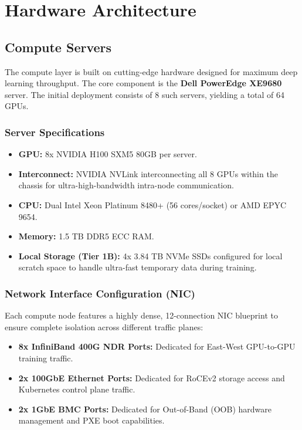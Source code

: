\chapter{Hardware Architecture}

\section{Compute Servers}
The compute layer is built on cutting-edge hardware designed for maximum deep learning throughput. The core component is the \textbf{Dell PowerEdge XE9680} server. The initial deployment consists of 8 such servers, yielding a total of 64 GPUs.

\subsection{Server Specifications}
\begin{itemize}
    \item \textbf{GPU:} 8x NVIDIA H100 SXM5 80GB per server.
    \item \textbf{Interconnect:} NVIDIA NVLink interconnecting all 8 GPUs within the chassis for ultra-high-bandwidth intra-node communication.
    \item \textbf{CPU:} Dual Intel Xeon Platinum 8480+ (56 cores/socket) or AMD EPYC 9654.
    \item \textbf{Memory:} 1.5 TB DDR5 ECC RAM.
    \item \textbf{Local Storage (Tier 1B):} 4x 3.84 TB NVMe SSDs configured for local scratch space to handle ultra-fast temporary data during training.
\end{itemize}

\subsection{Network Interface Configuration (NIC)}
Each compute node features a highly dense, 12-connection NIC blueprint to ensure complete isolation across different traffic planes:
\begin{itemize}
    \item \textbf{8x InfiniBand 400G NDR Ports:} Dedicated for East-West GPU-to-GPU training traffic.
    \item \textbf{2x 100GbE Ethernet Ports:} Dedicated for RoCEv2 storage access and Kubernetes control plane traffic.
    \item \textbf{2x 1GbE BMC Ports:} Dedicated for Out-of-Band (OOB) hardware management and PXE boot capabilities.
\end{itemize}


